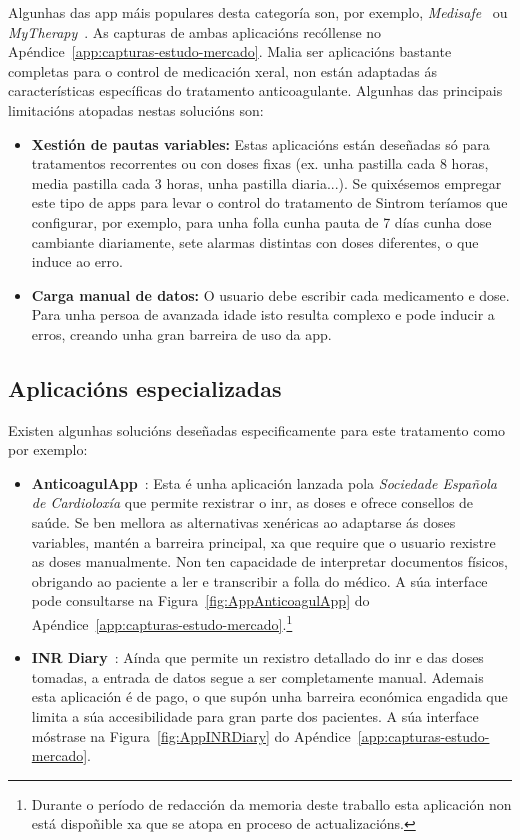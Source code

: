 Algunhas das app máis populares desta categoría son, por exemplo, \textit{Medisafe}~\cite{AppMedisafe} ou \textit{MyTherapy}~\cite{AppMyTherapy}. As capturas de ambas aplicacións recóllense no Apéndice~\ref{app:capturas-estudo-mercado}. Malia ser aplicacións bastante completas para o control de medicación xeral, non están adaptadas ás características específicas do tratamento anticoagulante. Algunhas das principais limitacións atopadas nestas solucións son:
\begin{itemize}
    \item \textbf{Xestión de pautas variables:} Estas aplicacións están deseñadas só para tratamentos recorrentes ou con doses fixas (ex. unha pastilla cada 8 horas, media pastilla cada 3 horas, unha pastilla diaria...). Se quixésemos empregar este tipo de apps para levar o control do tratamento de Sintrom teríamos que configurar, por exemplo, para unha folla cunha pauta de 7 días cunha dose cambiante diariamente, sete alarmas distintas con doses diferentes, o que induce ao erro.
    \item \textbf{Carga manual de datos:} O usuario debe escribir cada medicamento e dose. Para unha persoa de avanzada idade isto resulta complexo e pode inducir a erros, creando unha gran barreira de uso da app.
\end{itemize}

\subsection{Aplicacións especializadas}
Existen algunhas solucións deseñadas especificamente para este tratamento como por exemplo:
\begin{itemize}
    \item \textbf{AnticoagulApp}~\cite{AppAnticoagulApp}: Esta é unha aplicación lanzada pola \textit{Sociedade Española de Cardioloxía} que permite rexistrar o \gls{inr}, as doses e ofrece consellos de saúde. Se ben mellora as alternativas xenéricas ao adaptarse ás doses variables, mantén a barreira principal, xa que require que o usuario rexistre as doses manualmente. Non ten capacidade de interpretar documentos físicos, obrigando ao paciente a ler e transcribir a folla do médico. A súa interface pode consultarse na Figura~\ref{fig:AppAnticoagulApp} do Apéndice~\ref{app:capturas-estudo-mercado}.\footnote{Durante o período de redacción da memoria deste traballo esta aplicación non está dispoñible xa que se atopa en proceso de actualizacións.}
    \item \textbf{INR Diary}~\cite{AppINRDiary}: Aínda que permite un rexistro detallado do \gls{inr} e das doses tomadas, a entrada de datos segue a ser completamente manual. Ademais esta aplicación é de pago, o que supón unha barreira económica engadida que limita a súa accesibilidade para gran parte dos pacientes. A súa interface móstrase na Figura~\ref{fig:AppINRDiary} do Apéndice~\ref{app:capturas-estudo-mercado}.
\end{itemize}

